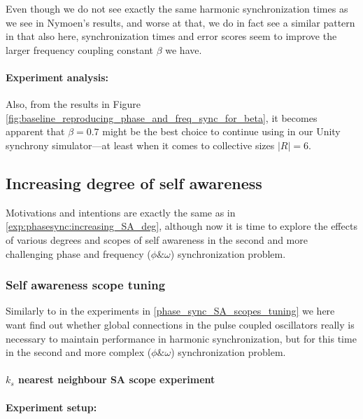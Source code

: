 		Even though we do not see exactly the same harmonic synchronization times as we see in Nymoen's results, and worse at that, we do in fact see a similar pattern in that also here, synchronization times and error scores seem to improve the larger frequency coupling constant $\beta$ we have.
		
		\paragraph{Experiment analysis:\nl}
		
		Also, from the results in Figure \ref{fig:baseline_reproducing_phase_and_freq_sync_for_beta}, it becomes apparent that $\beta=0.7$ might be the best choice to continue using in our Unity synchrony simulator—at least when it comes to collective sizes $|R|=6$.
		
	
	\subsection{Increasing degree of self awareness}
	\label{exp:phase_and_freq_sync:increasing_SA_deg}
	
	Motivations and intentions are exactly the same as in \ref{exp:phasesync:increasing_SA_deg}, although now it is time to explore the effects of various degrees and scopes of self awareness in the second and more challenging phase and frequency ($\phi \& \omega$) synchronization problem.
	
		\subsubsection{Self awareness scope tuning}
		\label{phase_and_freq_sync_SA_scopes_tuning}
		
		Similarly to in the experiments in \ref{phase_sync_SA_scopes_tuning} we here want find out whether global connections in the pulse coupled oscillators really is necessary to maintain performance in harmonic synchronization, but for this time in the second and more complex ($\phi \& \omega$) synchronization problem.
		
			\paragraph{$k_s$ nearest neighbour SA scope experiment\nl}
			
				\paragraph{Experiment setup:\nl}
			
